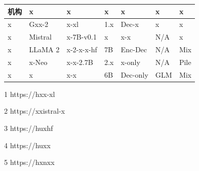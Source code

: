 \begin{table}[htbp]\footnotesize
	\centering
	
	\begin{threeparttable}[b]
		\label{sec-llms}
		\begin{tabular}{@{}lllllll@{}}
			\hline%
			\rowcolor{gray!15}
			\textbf{机构} & \textbf{x} & \textbf{x} & \textbf{x} &  \textbf{x} & \textbf{x} & \textbf{x} \\ \hline%
			x           & Gxx-2\cite{journalkey}               & x-xl\tnote{1}  & 1.x              & Dec-x       & x & x\cite{journalkey}                   \\
			x      & Mistral\cite{conferencekey}              & x-7B-v0.1\tnote{2}  & x            & x-x       & N/A & x                   \\
			x      & LLaMA 2\cite{conferencekey}              & 
			x-2-x-x-hf\tnote{3}  & 7B           & Enc-Dec       & N/A & Mix                   \\
			x           & x-Neo\cite{conferencekey}              & x-x-2.7B\tnote{4}  & 2.x            & x-only       & N/A & Pile\cite{journalkey}                   \\
			x & x\cite{journalkey} & x-x\tnote{5} & 6B & Dec-only & GLM & Mix \\ 
			\hline%
		\end{tabular}%
		
		\begin{tablenotes}
			\item[1] https://hxx-xl
			\item[2] https://xxistral-x
			\item[3] https://huxhf
			\item[4] https://huxx
			\item[5] https://hxnxx
		\end{tablenotes}
	\end{threeparttable}
\end{table}


